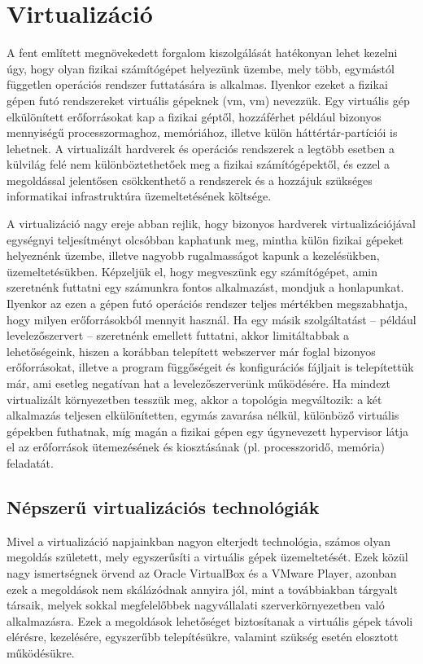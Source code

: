 \section{Virtualizáció}
A fent említett megnövekedett forgalom kiszolgálását hatékonyan lehet kezelni úgy, hogy olyan fizikai számítógépet helyezünk üzembe, mely  több, egymástól független operációs rendszer futtatására is alkalmas. Ilyenkor ezeket a fizikai gépen futó rendszereket virtuális gépeknek (\acrlong{vm}, \acrshort{vm}) nevezzük. Egy virtuális gép elkülönített erőforrásokat kap a fizikai géptől, hozzáférhet például bizonyos mennyiségű processzormaghoz, memóriához, illetve külön háttértár-partíciói is lehetnek. A virtualizált hardverek és operációs rendszerek a legtöbb esetben a külvilág felé nem különböztethetőek meg a fizikai számítógépektől, és ezzel a megoldással jelentősen csökkenthető a rendszerek és a hozzájuk szükséges informatikai infrastruktúra üzemeltetésének költsége.

A virtualizáció nagy ereje abban rejlik, hogy bizonyos hardverek virtualizációjával egységnyi teljesítményt olcsóbban kaphatunk meg, mintha külön fizikai gépeket helyeznénk üzembe, illetve nagyobb rugalmasságot kapunk a kezelésükben, üzemeltetésükben. Képzeljük el, hogy megveszünk egy számítógépet, amin szeretnénk futtatni egy számunkra fontos alkalmazást, mondjuk a honlapunkat. Ilyenkor az ezen a gépen futó operációs rendszer teljes mértékben megszabhatja, hogy milyen erőforrásokból mennyit használ. Ha egy másik szolgáltatást -- például levelezőszervert -- szeretnénk emellett futtatni, akkor limitáltabbak a lehetőségeink, hiszen a korábban telepített webszerver már foglal bizonyos erőforrásokat, illetve a program függőségeit és konfigurációs fájljait is telepítettük már, ami esetleg negatívan hat a levelezőszerverünk működésére. Ha mindezt virtualizált környezetben tesszük meg, akkor a topológia megváltozik: a két alkalmazás teljesen elkülönítetten, egymás zavarása nélkül, különböző virtuális gépekben futhatnak, míg magán a fizikai gépen egy úgynevezett hypervisor látja el az erőforrások ütemezésének és kiosztásának (pl. processzoridő, memória) feladatát.

\subsection{Népszerű virtualizációs technológiák}
Mivel a virtualizáció napjainkban nagyon elterjedt technológia, számos olyan megoldás született, mely egyszerűsíti a virtuális gépek üzemeltetését. Ezek közül nagy ismertségnek örvend az Oracle VirtualBox és a VMware Player, azonban ezek a megoldások nem skálázódnak annyira jól, mint a továbbiakban tárgyalt társaik, melyek sokkal megfelelőbbek nagyvállalati szerverkörnyezetben való alkalmazásra. Ezek a megoldások lehetőséget biztosítanak a virtuális gépek távoli elérésre, kezelésére, egyszerűbb telepítésükre, valamint szükség esetén elosztott működésükre.

